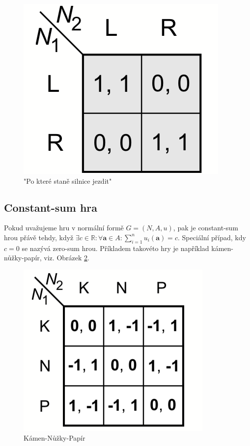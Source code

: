 \documentclass{article}
\begin{document}
\begin{figure}[h]
\begin{center}
\includegraphics[scale=0.8]{LeftOrRight}
\caption{"Po které staně silnice jezdit"}
\label{fig:roadSide}
\end{center}
\end{figure}

\subsection*{Constant-sum hra}

Pokud uvažujeme hru v normální formě $G = (N, A, u)$, pak je constant-sum hrou přávě tehdy, když $\exists c \in \mathbb{R}: \forall \boldsymbol{a} \in A: \sum_{i = 1}^{n} u_i(\boldsymbol{a}) = c$. Speciální případ, kdy $c = 0$ se nazývá zero-sum hrou. Příkladem takovéto hry je například kámen-nůžky-papír, viz. Obrázek \ref{fig:knp}.

\begin{figure}[h]
\begin{center}
\includegraphics[scale=0.8]{KNP}
\caption{Kámen-Nůžky-Papír}
\label{fig:knp}
\end{center}
\end{figure}
\end{document}
